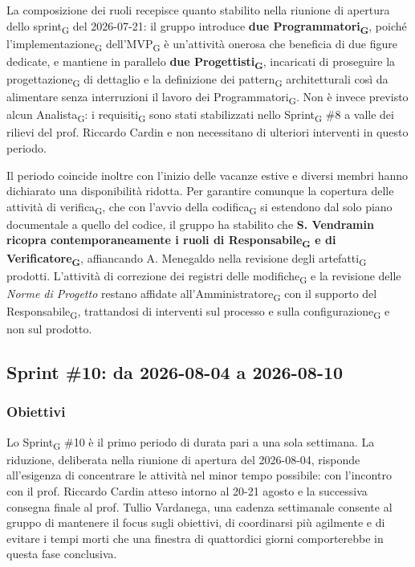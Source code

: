 ﻿\documentclass[a4paper, 10pt, colorlinks=true, linkcolor=black, urlcolor=blue, citecolor=blue, hidelinks]{article}
\begin{document}
La composizione dei ruoli recepisce quanto stabilito nella riunione di apertura dello sprint\textsubscript{G} del 2026-07-21: il gruppo introduce \textbf{due Programmatori\textsubscript{G}}, poiché l'implementazione\textsubscript{G} dell'MVP\textsubscript{G} è un'attività onerosa che beneficia di due figure dedicate, e mantiene in parallelo \textbf{due Progettisti\textsubscript{G}}, incaricati di proseguire la progettazione\textsubscript{G} di dettaglio e la definizione dei pattern\textsubscript{G} architetturali così da alimentare senza interruzioni il lavoro dei Programmatori\textsubscript{G}. Non è invece previsto alcun Analista\textsubscript{G}: i requisiti\textsubscript{G} sono stati stabilizzati nello Sprint\textsubscript{G} \#8 a valle dei rilievi del prof. Riccardo Cardin e non necessitano di ulteriori interventi in questo periodo.

Il periodo coincide inoltre con l'inizio delle vacanze estive e diversi membri hanno dichiarato una disponibilità ridotta. Per garantire comunque la copertura delle attività di verifica\textsubscript{G}, che con l'avvio della codifica\textsubscript{G} si estendono dal solo piano documentale a quello del codice, il gruppo ha stabilito che \textbf{S. Vendramin ricopra contemporaneamente i ruoli di Responsabile\textsubscript{G} e di Verificatore\textsubscript{G}}, affiancando A. Menegaldo nella revisione degli artefatti\textsubscript{G} prodotti. L'attività di correzione dei registri delle modifiche\textsubscript{G} e la revisione delle \textit{Norme di Progetto} restano affidate all'Amministratore\textsubscript{G} con il supporto del Responsabile\textsubscript{G}, trattandosi di interventi sul processo e sulla configurazione\textsubscript{G} e non sul prodotto.

\subsection{Sprint \#10: da 2026-08-04 a 2026-08-10}

\subsubsection{Obiettivi}
Lo Sprint\textsubscript{G} \#10 è il primo periodo di durata pari a una sola settimana. La riduzione, deliberata nella riunione di apertura del 2026-08-04, risponde all'esigenza di concentrare le attività nel minor tempo possibile: con l'incontro con il prof. Riccardo Cardin atteso intorno al 20-21 agosto e la successiva consegna finale al prof. Tullio Vardanega, una cadenza settimanale consente al gruppo di mantenere il focus sugli obiettivi, di coordinarsi più agilmente e di evitare i tempi morti che una finestra di quattordici giorni comporterebbe in questa fase conclusiva.
\end{document}
